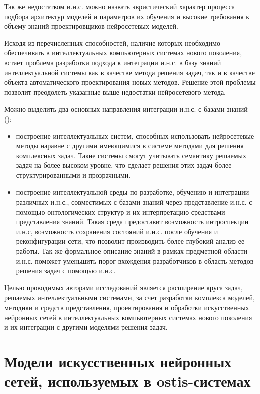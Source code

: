 Так же недостатком и.н.с. можно назвать эвристический характер процесса подбора архитектур моделей и параметров их обучения и высокие требования к объему знаний проектировщиков нейросетевых моделей. 

Исходя из перечисленных способностей, наличие которых необходимо обеспечивать в интеллектуальных компьютерных системах нового поколения, встает проблема разработки подхода к интеграции и.н.с. в базу знаний интеллектуальной системы как в качестве метода решения задач, так и в качестве объекта автоматического проектирования новых методов. Решение этой проблемы позволит преодолеть указанные выше недостатки нейросетевого метода.

Можно выделить два основных направления интеграции и.н.с. с базами знаний (\cite{Kovalev2021}):
\begin{itemize}
	\item построение интеллектуальных систем, способных использовать нейросетевые методы наравне с другими имеющимися в системе методами для решения комплексных задач. Такие системы смогут учитывать семантику решаемых задач на более высоком уровне, что сделает решения этих задач более структурированными и прозрачными.
	\item построение интеллектуальной среды по разработке, обучению и интеграции различных и.н.с., совместимых с базами знаний через представление и.н.с. с помощью онтологических структур и их интерпретацию средствами представления знаний. Такая среда предоставит возможность интроспекции и.н.с, возможность сохранения состояний и.н.с. после обучения и реконфигурации сети, что позволит производить более глубокий анализ ее работы. Так же формальное описание знаний в рамках предметной области и.н.с. поможет уменьшить порог вхождения разработчиков в область методов решения задач с помощью и.н.с.
\end{itemize}

Целью проводимых авторами исследований является расширение круга задач, решаемых интеллектуальными системами, за счет разработки комплекса моделей, методики и средств представления, проектирования и обработки искусственных нейронных сетей в интеллектуальных компьютерных системах нового поколения и их интеграции с другими моделями решения задач.

\section{Модели искусственных нейронных сетей, используемых в ostis-системах}

